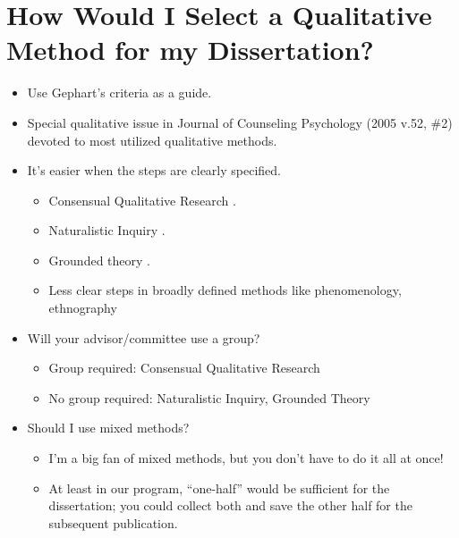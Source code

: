 \documentclass[
  english,
]{book}
\providecommand{\tightlist}{%
  \setlength{\itemsep}{0pt}\setlength{\parskip}{0pt}}
\begin{document}
\hypertarget{how-would-i-select-a-qualitative-method-for-my-dissertation}{%
\section{How Would I Select a Qualitative Method for my Dissertation?}\label{how-would-i-select-a-qualitative-method-for-my-dissertation}}

\begin{itemize}
\tightlist
\item
  Use Gephart's criteria as a guide.
\item
  Special qualitative issue in Journal of Counseling Psychology (2005 v.52, \#2) devoted to most utilized qualitative methods.
\item
  It's easier when the steps are clearly specified.

  \begin{itemize}
  \tightlist
  \item
    Consensual Qualitative Research \citep{hill_consensual_2005, hill_consensual_2012}.
  \item
    Naturalistic Inquiry \citep{erlandson_doing_1993, lincoln_naturalistic_1985}.
  \item
    Grounded theory \citep{fassinger_paradigms_2005}.
  \item
    Less clear steps in broadly defined methods like phenomenology, ethnography
  \end{itemize}
\item
  Will your advisor/committee use a group?

  \begin{itemize}
  \tightlist
  \item
    Group required: Consensual Qualitative Research
  \item
    No group required: Naturalistic Inquiry, Grounded Theory
  \end{itemize}
\item
  Should I use mixed methods?

  \begin{itemize}
  \tightlist
  \item
    I'm a big fan of mixed methods, but you don't have to do it all at once!
  \item
    At least in our program, ``one-half'' would be sufficient for the dissertation; you could collect both and save the other half for the subsequent publication.
  \end{itemize}
\end{itemize}
\end{document}
